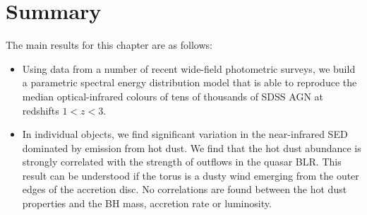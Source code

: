 \section{Summary}

The main results for this chapter are as follows:

\begin{itemize}

\item Using data from a number of recent wide-field photometric surveys, we build a parametric spectral energy distribution model that is able to reproduce the median optical-infrared colours of tens of thousands of SDSS AGN at redshifts $1 < z < 3$. 

\item In individual objects, we find significant variation in the near-infrared SED dominated by emission from hot dust. We find that the hot dust abundance is strongly correlated with the strength of outflows in the quasar BLR. This result can be understood if the torus is a dusty wind emerging from the outer edges of the accretion disc. No correlations are found between the hot dust properties and the BH mass, accretion rate or luminosity. 

\end{itemize}